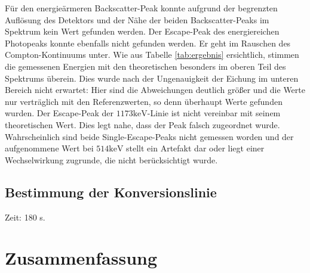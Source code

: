 \documentclass[
	parskip=half,10pt,
	numbers= noenddot, %
	toc=flat, %
	oneside,
	twocolumn,
	]{scrartcl}
\begin{document}
Für den energieärmeren Backscatter-Peak konnte aufgrund der begrenzten Auflösung des Detektors und der Nähe der beiden Backscatter-Peaks im Spektrum kein Wert gefunden 
werden. Der Escape-Peak des energiereichen Photopeaks konnte ebenfalls nicht gefunden werden. Er geht im Rauschen des Compton-Kontinuums unter. 
Wie aus Tabelle \ref{tab:ergebnis} ersichtlich, stimmen die gemessenen Energien mit den theoretischen besonders im oberen Teil des Spektrums überein. Dies wurde 
nach der Ungenauigkeit der Eichung im unteren Bereich nicht erwartet: Hier sind die Abweichungen deutlich größer und die Werte nur verträglich mit den Referenzwerten, 
so denn überhaupt Werte gefunden wurden. Der Escape-Peak der $1173 \si{\kilo \electronvolt}$-Linie ist nicht vereinbar mit seinem theoretischen Wert. Dies legt nahe, 
dass der Peak falsch zugeordnet wurde. Wahrscheinlich sind beide Single-Escape-Peaks nicht gemessen worden und der aufgenommene Wert bei 
$514 \si{\kilo \electronvolt}$ stellt ein Artefakt dar oder liegt einer Wechselwirkung zugrunde, die nicht berücksichtigt wurde. 

\subsection{Bestimmung der Konversionslinie}

Zeit: 180 s.



\section{Zusammenfassung}

\onecolumn
\newpage




\FloatBarrier

\newpage
\end{document}
